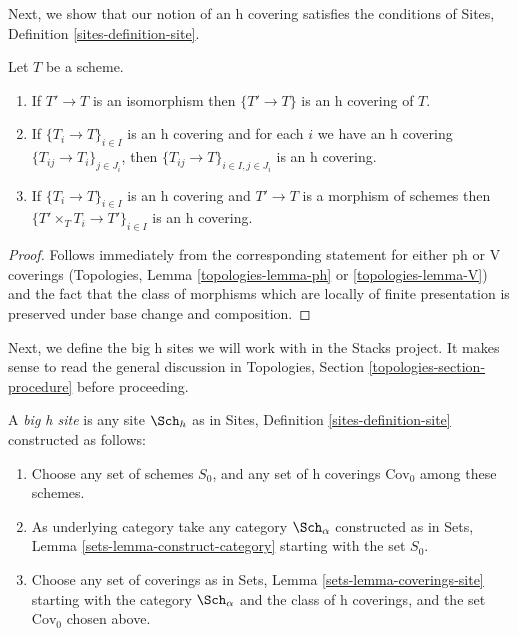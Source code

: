\noindent
Next, we show that our notion of an h covering satisfies the conditions of
Sites, Definition \ref{sites-definition-site}.

\begin{lemma}
\label{lemma-h}
Let $T$ be a scheme.
\begin{enumerate}
\item If $T' \to T$ is an isomorphism then $\{T' \to T\}$
is an h covering of $T$.
\item If $\{T_i \to T\}_{i\in I}$ is an h covering and for each
$i$ we have an h covering $\{T_{ij} \to T_i\}_{j\in J_i}$, then
$\{T_{ij} \to T\}_{i \in I, j\in J_i}$ is an h covering.
\item If $\{T_i \to T\}_{i\in I}$ is an h covering
and $T' \to T$ is a morphism of schemes then
$\{T' \times_T T_i \to T'\}_{i\in I}$ is an h covering.
\end{enumerate}
\end{lemma}

\begin{proof}
Follows immediately from the corresponding statement for
either ph or V coverings
(Topologies, Lemma \ref{topologies-lemma-ph} or
\ref{topologies-lemma-V})
and the fact that the class of morphisms which are locally
of finite presentation is preserved under base change and
composition.
\end{proof}

\noindent
Next, we define the big h sites we will work with in the
Stacks project. It makes sense to read the general discussion
in Topologies, Section \ref{topologies-section-procedure}
before proceeding.

\begin{definition}
\label{definition-big-h-site}
A {\it big h site} is any site $\Sch_h$ as in
Sites, Definition \ref{sites-definition-site} constructed as follows:
\begin{enumerate}
\item Choose any set of schemes $S_0$, and any set of h coverings
$\text{Cov}_0$ among these schemes.
\item As underlying category take any category $\Sch_\alpha$
constructed as in Sets, Lemma \ref{sets-lemma-construct-category}
starting with the set $S_0$.
\item Choose any set of coverings as in
Sets, Lemma \ref{sets-lemma-coverings-site} starting with the
category $\Sch_\alpha$ and the class of h coverings,
and the set $\text{Cov}_0$ chosen above.
\end{enumerate}
\end{definition}

